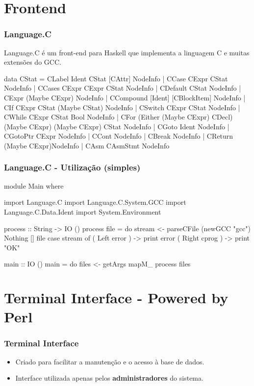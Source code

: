 \documentclass{beamer}
\begin{document}
\section{Frontend}
\begin{frame}[fragile]  \frametitle{Language.C}
Language.C é um front-end para Haskell que implementa a linguagem C e muitas extensões do GCC.\\
\begin{haskell}
data CStat = CLabel  Ident CStat [CAttr] NodeInfo
           | CCase CExpr CStat NodeInfo            
           | CCases CExpr CExpr CStat NodeInfo     
           | CDefault CStat NodeInfo               
           | CExpr (Maybe CExpr) NodeInfo
           | CCompound [Ident] [CBlockItem] NodeInfo    
           | CIf CExpr CStat (Maybe CStat) NodeInfo     
           | CSwitch CExpr CStat NodeInfo
           | CWhile CExpr CStat Bool NodeInfo      
           | CFor (Either (Maybe CExpr) CDecl) (Maybe CExpr) (Maybe CExpr) CStat
             NodeInfo
           | CGoto Ident NodeInfo            
           | CGotoPtr CExpr NodeInfo         
           | CCont NodeInfo                  
           | CBreak    NodeInfo              
           | CReturn (Maybe CExpr)NodeInfo   
           | CAsm CAsmStmt NodeInfo          
\end{haskell}
\end{frame}

\begin{frame}[fragile]  \frametitle{Language.C - Utilização (simples)}
\begin{haskell}
module Main where

import Language.C
import Language.C.System.GCC
import Language.C.Data.Ident
import System.Environment

process :: String -> IO ()
process file = do
    stream <- parseCFile (newGCC "gcc") Nothing [] file
    case stream of
        ( Left error  ) -> print error
        ( Right cprog ) -> print "OK"

main :: IO ()
main = do
    files <- getArgs
    mapM_ process files
\end{haskell}
\end{frame}

\section{Terminal Interface - Powered by Perl}
\begin{frame} \frametitle{Terminal Interface}
\begin{itemize}
 \item Criado para facilitar a manutenção e o acesso à base de dados.
 \item Interface utilizada apenas pelos \textbf{administradores} do sistema.
\end{itemize}
\end{frame}
\end{document}
